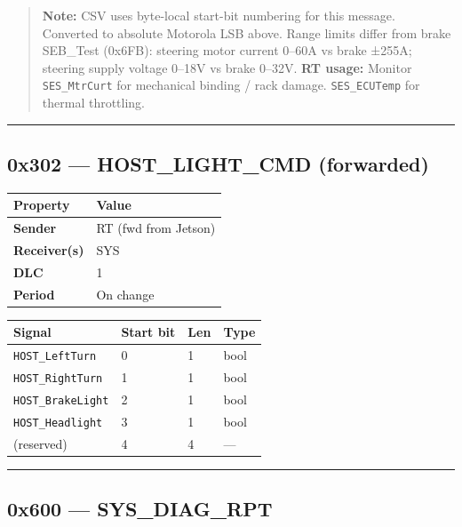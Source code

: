 \begin{quote}
\textbf{Note:} CSV uses byte-local start-bit numbering for this message.
Converted to absolute Motorola LSB above. Range limits differ from brake
SEB\_Test (0x6FB): steering motor current 0--60A vs brake ±255A; steering supply
voltage 0--18V vs brake 0--32V. \textbf{RT usage:} Monitor \texttt{SES\_MtrCurt}
for mechanical binding / rack damage. \texttt{SES\_ECUTemp} for thermal
throttling.
\end{quote}

\begin{center}\rule{0.5\linewidth}{0.5pt}\end{center}

\subsection{0x302 --- HOST\_LIGHT\_CMD
(forwarded)}\label{x302-host_light_cmd-forwarded}

\begin{longtable}[]{@{}ll@{}}
\toprule\noalign{}
Property & Value \\
\midrule\noalign{}
\endhead
\bottomrule\noalign{}
\endlastfoot
\textbf{Sender} & RT (fwd from Jetson) \\
\textbf{Receiver(s)} & SYS \\
\textbf{DLC} & 1 \\
\textbf{Period} & On change \\
\end{longtable}

\begin{longtable}[]{@{}llll@{}}
\toprule\noalign{}
Signal & Start bit & Len & Type \\
\midrule\noalign{}
\endhead
\bottomrule\noalign{}
\endlastfoot
\texttt{HOST\_LeftTurn} & 0 & 1 & bool \\
\texttt{HOST\_RightTurn} & 1 & 1 & bool \\
\texttt{HOST\_BrakeLight} & 2 & 1 & bool \\
\texttt{HOST\_Headlight} & 3 & 1 & bool \\
(reserved) & 4 & 4 & --- \\
\end{longtable}

\begin{center}\rule{0.5\linewidth}{0.5pt}\end{center}

\subsection{0x600 --- SYS\_DIAG\_RPT}\label{x600-sys_diag_rpt}

